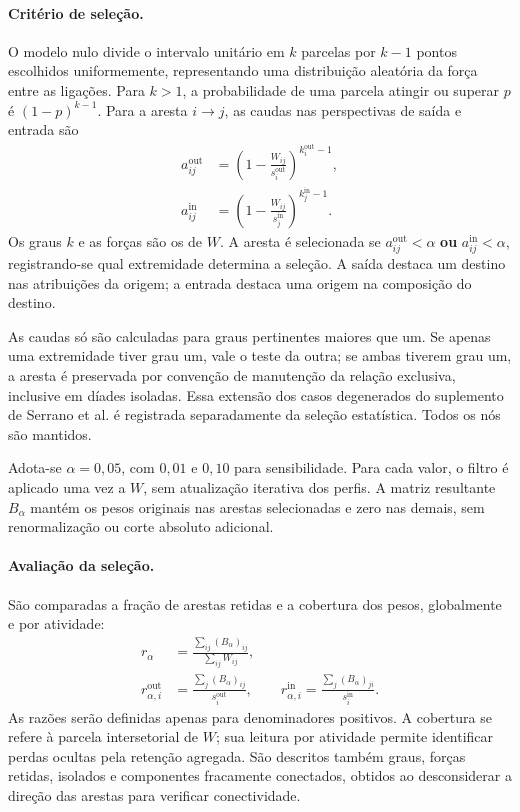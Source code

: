 \paragraph{Critério de seleção.}
O modelo nulo divide o intervalo unitário em $k$ parcelas por $k-1$ pontos escolhidos uniformemente, representando uma distribuição aleatória da força entre as ligações. Para $k>1$, a probabilidade de uma parcela atingir ou superar $p$ é $(1-p)^{k-1}$. Para a aresta $i\rightarrow j$, as caudas nas perspectivas de saída e entrada são
\begin{equation}
\begin{aligned}
a_{ij}^{\mathrm{out}}&=\left(1-\frac{W_{ij}}{s_i^{\mathrm{out}}}\right)^{k_i^{\mathrm{out}}-1},\\
a_{ij}^{\mathrm{in}}&=\left(1-\frac{W_{ij}}{s_j^{\mathrm{in}}}\right)^{k_j^{\mathrm{in}}-1}.
\end{aligned}
\label{eq:caudas-filtro}
\end{equation}
Os graus $k$ e as forças são os de $W$. A aresta é selecionada se $a_{ij}^{\mathrm{out}}<\alpha$ \textbf{ou} $a_{ij}^{\mathrm{in}}<\alpha$, registrando-se qual extremidade determina a seleção. A saída destaca um destino nas atribuições da origem; a entrada destaca uma origem na composição do destino.

As caudas só são calculadas para graus pertinentes maiores que um. Se apenas uma extremidade tiver grau um, vale o teste da outra; se ambas tiverem grau um, a aresta é preservada por convenção de manutenção da relação exclusiva, inclusive em díades isoladas. Essa extensão dos casos degenerados do suplemento de Serrano et al. é registrada separadamente da seleção estatística. Todos os nós são mantidos.

Adota-se $\alpha=0{,}05$, com $0{,}01$ e $0{,}10$ para sensibilidade. Para cada valor, o filtro é aplicado uma vez a $W$, sem atualização iterativa dos perfis. A matriz resultante $B_\alpha$ mantém os pesos originais nas arestas selecionadas e zero nas demais, sem renormalização ou corte absoluto adicional.

\paragraph{Avaliação da seleção.}
São comparadas a fração de arestas retidas e a cobertura dos pesos, globalmente e por atividade:
\begin{equation}
\begin{aligned}
r_\alpha&=\frac{\sum_{ij}(B_\alpha)_{ij}}{\sum_{ij}W_{ij}},\\
r_{\alpha,i}^{\mathrm{out}}&=\frac{\sum_j(B_\alpha)_{ij}}{s_i^{\mathrm{out}}},\qquad
r_{\alpha,i}^{\mathrm{in}}=\frac{\sum_j(B_\alpha)_{ji}}{s_i^{\mathrm{in}}}.
\end{aligned}
\label{eq:cobertura-backbone}
\end{equation}
As razões serão definidas apenas para denominadores positivos. A cobertura se refere à parcela intersetorial de $W$; sua leitura por atividade permite identificar perdas ocultas pela retenção agregada. São descritos também graus, forças retidas, isolados e componentes fracamente conectados, obtidos ao desconsiderar a direção das arestas para verificar conectividade.

